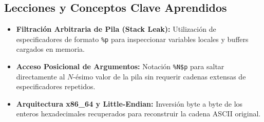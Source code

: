 \documentclass[../../../main_compilation.tex]{subfiles}
\begin{document}
\subsection{Lecciones y Conceptos Clave Aprendidos}

\begin{learningbox}
	\begin{itemize}[leftmargin=*]
		\item \textbf{Filtración Arbitraria de Pila (Stack Leak):} Utilización de especificadores de formato \texttt{\%p} para inspeccionar variables locales y buffers cargados en memoria.
		\item \textbf{Acceso Posicional de Argumentos:} Notación \texttt{\%N\$p} para saltar directamente al $N$-ésimo valor de la pila sin requerir cadenas extensas de especificadores repetidos.
		\item \textbf{Arquitectura x86\_64 y Little-Endian:} Inversión byte a byte de los enteros hexadecimales recuperados para reconstruir la cadena ASCII original.
	\end{itemize}
\end{learningbox}

\begin{sourcebox}
	\begin{itemize}[leftmargin=*]
	\end{itemize}
\end{sourcebox}
\end{document}
